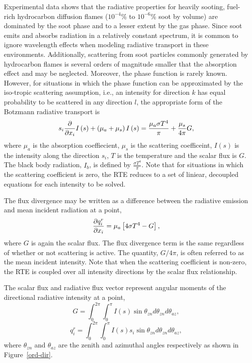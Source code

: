 Experimental data shows that the radiative properties for 
heavily sooting, fuel-rich hydrocarbon diffusion flames 
($10^{-4}$\% to $10^{-6}$\% soot by volume) are dominated by 
the soot phase and to a lesser extent by the gas phase. Since 
soot emits and absorbs radiation in a relatively constant 
spectrum, it is common to ignore wavelength effects when modeling 
radiative transport in these environments.  Additionally, scattering 
from soot particles commonly generated by hydrocarbon flames is 
several orders of magnitude smaller that the absorption effect 
and may be neglected.  Moreover, the phase function is rarely known. However,
for situations in which the phase function can be approximated by the iso-tropic scattering
assumption, i.e., an intensity for direction $k$ has equal probability to be scattered
in any direction $l$, the appropriate form of the Botzmann radiative transport is
%
\begin{equation}
   s_i {{\partial} \over {\partial x_i}} I\left(s\right)
   + \left(\mu_a + \mu_s \right) I\left(s\right) = {{\mu_a \sigma T^4} \over {\pi}} + \frac{\mu_s}{4\pi}G,
\label{lam-scalar-flux}
\end{equation}
%
where $\mu_a$ is the absorption coeffiecient, $\mu_s$ is the scattering
coefficeint, $I(s)$ is the intensity 
along the direction $s_i$, $T$ is the temperature and the scalar flux is $G$. 
The black body radiation, $I_b$, is defined by $\frac{\sigma T^4}{\pi}$.
Note that for situations in which the scattering coefficient is zero, the RTE
reduces to a set of liniear, decoupled equations for each intensity to be solved.  

The flux divergence may be written 
as a difference between the radiative emission and mean incident 
radiation at a point,
%
\begin{equation}
   {{\partial q_i^r} \over {\partial x_i}} =
    \mu_a \left[ 4 \sigma T^4 - G \right] ,
\label{div-qrad}
\end{equation}
%
where $G$ is again the scalar flux. The flux divergence term is the same regardless
of whether or not scattering is active. The quantity, $G/4\pi$, is often 
referred to as the mean incident intensity. Note that when the scattering 
coefficient is non-zero, the RTE is coupled over all intensity directions by
the scalar flux relationship.

The scalar flux and radiative flux vector represent angular 
moments of the directional radiative intensity at a 
point,
%
\begin{equation}
   G = \int_{0}^{2\pi}\!\int_{0}^{\pi}\! I\left(s\right)
        \sin \theta_{zn} d \theta_{zn} d \theta_{az} ,
\end{equation}
%
\begin{equation}
   q^{r}_{i} = \int_{0}^{2\pi}\!\int_{0}^{\pi}\! I\left(s\right)
        s_i \sin \theta_{zn} d \theta_{zn} d \theta_{az} ,
\end{equation}
%
where $\theta_{zn}$ and $\theta_{az}$ are the zenith and azimuthal 
angles respectively as shown in Figure~\ref{ord-dir}.

